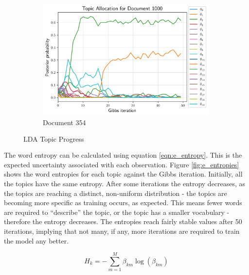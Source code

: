 \documentclass[11pt]{amsart}
\begin{document}
\begin{figure}[h]
{\begin{subfigure}[b]{0.35\textwidth}
            \includegraphics[width=0.99\textwidth]{../plots/e_thetas_doc_1000.png}
            \caption{Document 354}
        \end{subfigure}}
    \caption{LDA Topic Progress}\label{fig:taske_thetas}
\end{figure}

The word entropy can be calculated using equation \ref{eqn:e_entropy}. This is the expected uncertainty associated with each observation. Figure \ref{fig:e_entropies} shows the word entropies for each topic against the Gibbs iteration. Initially, all the topics have the same entropy. After some iterations the entropy decreases, as the topics are reaching a distinct, non-uniform distribution - the topics are becoming more specific as training occurs, as expected. This means fewer words are required to ``describe'' the topic, or the topic has a smaller vocabulary - therefore the entropy decreases. The entropies reach fairly stable values after 50 iterations, implying that not many, if any, more iterations are required to train the model any better.

\begin{equation} \label{eqn:e_entropy}
    H_k = -\sum_{m=1}^{M}\beta_{km}\log(\beta_{km})
\end{equation}
\end{document}
